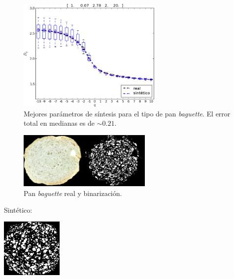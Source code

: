 \documentclass[spanish,unknownkeysallowed]{beamer}
\begin{document}
\begin{frame}
\begin{figure}[!ht]
\includegraphics[width=7cm]{../figures/bestboxplot}
\caption[Mejores parámetros de síntesis para el tipo de pan {\em baguette}]{Mejores parámetros de síntesis para el tipo de pan {\em baguette}. El error total en medianas es de $\sim 0.21$.}
\label{bestboxplot}
\end{figure}

\end{frame}

\begin{frame}
\begin{figure}
\begin{center}
\includegraphics[width=6.5cm]{../figures/realbin}
\caption{ Pan {\em baguette} real y binarización.}
\label{realbin}
\end{center}
\end{figure}
Sintético:
\begin{center}
\includegraphics[width=3cm]{../figures/best}
\end{center}
\end{frame}
\end{document}
